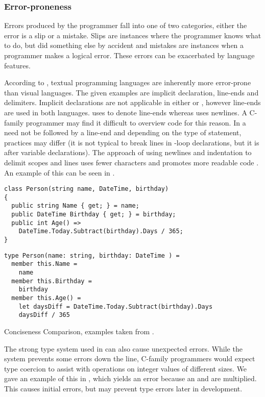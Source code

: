 \subsubsection{Error-proneness}
Errors produced by the programmer fall into one of two categories, either the error is a slip or a mistake. Slips are instances where the programmer knows what to do, but did something else by accident and mistakes are instances when a programmer makes a logical error. These errors can be exacerbated by language features.

According to \cite{green1996usability}, textual programming languages are inherently more error-prone than visual languages. The given examples are implicit declaration, line-ends and delimiters. Implicit declarations are not applicable in either \cs or \fs, however line-ends are used in both languages. \cs uses \m{;} to denote line-ends whereas \fs uses newlines. A C-family programmer may find it difficult to overview \fs code for this reason. In \cs a \m{;} need not be followed by a line-end and depending on the type of statement, practices may differ (it is not typical to break lines in -loop declarations, but it is after variable declarations).
The \fs approach of using newlines and indentation to delimit scopes and lines uses fewer characters and promotes more readable code \needcite{}. An example of this can be seen in .

\begin{listing}[H]
\begin{verbatim}
class Person(string name, DateTime, birthday)
{
  public string Name { get; } = name;
  public DateTime Birthday { get; } = birthday;
  public int Age() =>
    DateTime.Today.Subtract(birthday).Days / 365;
}
\end{verbatim}
\begin{verbatim}
type Person(name: string, birthday: DateTime ) =
  member this.Name =
    name
  member this.Birthday =
    birthday
  member this.Age() =
    let daysDiff = DateTime.Today.Subtract(birthday).Days
    daysDiff / 365
\end{verbatim}
\caption{Conciseness Comparison, examples taken from \cite{wlaschin2017FsharpForCsharpProgrammers}.}
\label{lst:con-comp}
\end{listing}

The strong type system used in \fs can also cause unexpected errors. While the system prevents some errors down the line, C-family programmers would expect type coercion to assist with operations on integer values of different sizes. We gave an example of this in , which yields an error because an  and  are multiplied. This causes initial errors, but may prevent type errors later in development\cite{ray2014large}.


